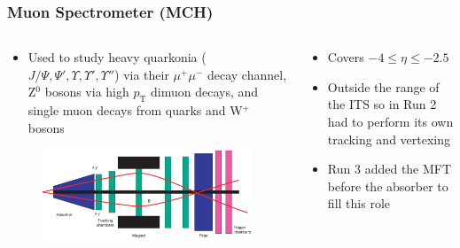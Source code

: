 \documentclass[11pt]{beamer}
\begin{document}
\begin{frame}
    \frametitle{Muon Spectrometer (MCH)}

    \begin{columns}[c]
        \begin{column}{0.6\textwidth}
            \begin{itemize}
                \item Used to study heavy quarkonia ($J/\Psi,\Psi',\Upsilon,\Upsilon',\Upsilon''$) via their $\mu^+\mu^-$ decay channel, Z$^0$ bosons via high $p_\mathrm{T}$ dimuon decays, and single muon decays from quarks and W$^+$ bosons
            \end{itemize}
            \begin{figure}[h]
                \begin{center}
                    \includegraphics[width=\textwidth]{Figs/MCH_schematic.png}
                \end{center}
            \end{figure}
        \end{column}

        \begin{column}{0.4\textwidth}
            \begin{itemize}
                \item Covers $-4\leq\eta\leq -2.5$
                \item Outside the range of the ITS so in Run 2 had to perform its own tracking and vertexing
                \item Run 3 added the MFT before the absorber to fill this role
            \end{itemize}
        \end{column}
    \end{columns}

\end{frame}
\end{document}
